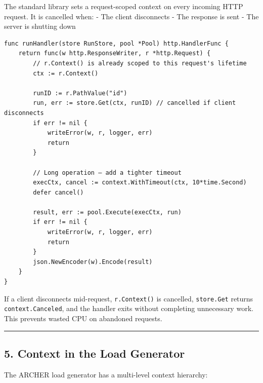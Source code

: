 \documentclass[11pt,a4paper,oneside]{book}
\begin{document}
The standard library sets a request-scoped context on every incoming
HTTP request. It is cancelled when: - The client disconnects - The
response is sent - The server is shutting down

\begin{verbatim}
func runHandler(store RunStore, pool *Pool) http.HandlerFunc {
    return func(w http.ResponseWriter, r *http.Request) {
        // r.Context() is already scoped to this request's lifetime
        ctx := r.Context()

        runID := r.PathValue("id")
        run, err := store.Get(ctx, runID) // cancelled if client disconnects
        if err != nil {
            writeError(w, r, logger, err)
            return
        }

        // Long operation — add a tighter timeout
        execCtx, cancel := context.WithTimeout(ctx, 10*time.Second)
        defer cancel()

        result, err := pool.Execute(execCtx, run)
        if err != nil {
            writeError(w, r, logger, err)
            return
        }
        json.NewEncoder(w).Encode(result)
    }
}
\end{verbatim}

If a client disconnects mid-request, \texttt{r.Context()} is cancelled,
\texttt{store.Get} returns \texttt{context.Canceled}, and the handler
exits without completing unnecessary work. This prevents wasted CPU on
abandoned requests.

\begin{center}\rule{0.5\linewidth}{0.5pt}\end{center}

\subsection{5. Context in the Load
Generator}

The ARCHER load generator has a multi-level context hierarchy:
\end{document}
